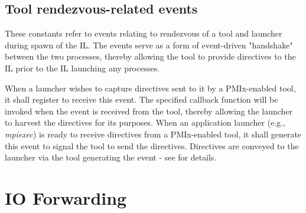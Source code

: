 %
%

\subsection{Tool rendezvous-related events}
\label{api:tools:attributes:spawnconst}

These constants refer to events relating to rendezvous of a tool and launcher during spawn of the \ac{IL}. The events serve as a form of event-driven "handshake" between the two processes, thereby allowing the tool to provide directives to the \ac{IL} prior to the \ac{IL} launching any processes.

\begin{constantdesc}
%
When a launcher wishes to capture directives sent to it by a \ac{PMIx}-enabled tool, it shall register to receive this event. The specified callback function will be invoked when the event is received from the tool, thereby allowing the launcher to harvest the directives for its purposes.
%
When an application launcher (e.g., \emph{mpiexec}) is ready to receive directives from a \ac{PMIx}-enabled tool, it shall generate this event to signal the tool to send the directives. Directives are conveyed to the launcher via the tool generating the  event - see  for details.
%
\end{constantdesc}

\section{IO Forwarding}
\label{chap:api_tools:iof}

